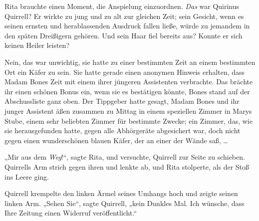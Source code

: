 Rita brauchte einen Moment, die Anspielung einzuordnen. \emph{Das} war Quirinus Quirrell? Er wirkte zu jung und zu alt zur gleichen Zeit; sein Gesicht, wenn es seinen ernsten und herablassenden Ausdruck fallen ließe, würde zu jemandem in den späten Dreißigern gehören. Und sein Haar fiel bereits aus? Konnte er sich keinen Heiler leisten?

Nein, das war unwichtig, sie hatte zu einer bestimmten Zeit an einem bestimmten Ort ein Käfer zu sein. Sie hatte gerade einen anonymen Hinweis erhalten, dass Madam Bones Zeit mit einem ihrer jüngeren Assistenten verbrachte. Das brächte ihr einen schönen Bonus ein, wenn sie es bestätigen könnte, Bones stand auf der Abschussliste ganz oben. Der Tippgeber hatte gesagt, Madam Bones und ihr junger Assistent äßen zusammen zu Mittag in einem speziellen Zimmer in Marys Stube, einem sehr beliebten Zimmer für bestimmte Zwecke; ein Zimmer, das, wie sie herausgefunden hatte, gegen alle Abhörgeräte abgesichert war, doch nicht gegen einen wunderschönen blauen Käfer, der an einer der Wände saß, …

„Mir aus dem \emph{Weg}!“, sagte Rita, und versuchte, Quirrell zur Seite zu schieben. Quirrells Arm strich gegen ihren und lenkte ab, und Rita stolperte, als der Stoß ins Leere ging.

Quirrell krempelte den linken Ärmel seines Umhangs hoch und zeigte seinen linken Arm.
„Sehen Sie“, sagte Quirrell, „kein Dunkles Mal. Ich wünsche, dass Ihre Zeitung einen Widerruf veröffentlicht.“

